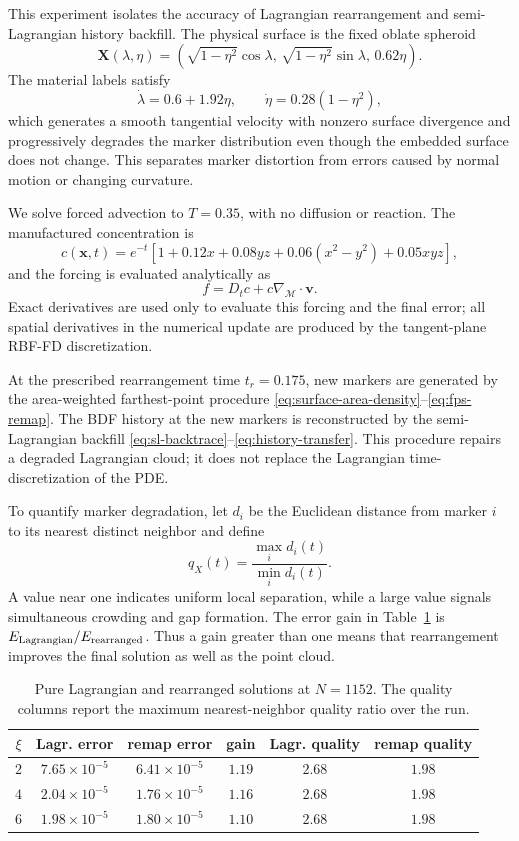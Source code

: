 \documentclass[a4paper,fleqn]{cas-sc}
\begin{document}
This experiment isolates the accuracy of Lagrangian rearrangement and
semi-Lagrangian history backfill.  The physical surface is the fixed oblate
spheroid
\[
  \bm X(\lambda,\eta)
  =
  \left(
    \sqrt{1-\eta^2}\cos\lambda,\,
    \sqrt{1-\eta^2}\sin\lambda,\,
    0.62\eta
  \right).
\]
The material labels satisfy
\[
  \dot\lambda=0.6+1.92\eta,
  \qquad
  \dot\eta=0.28(1-\eta^2),
\]
which generates a smooth tangential velocity with nonzero surface divergence
and progressively degrades the marker distribution even though the embedded
surface does not change.  This separates marker distortion from errors caused
by normal motion or changing curvature.

We solve forced advection to \(T=0.35\), with no diffusion or reaction.  The
manufactured concentration is
\[
  c(\bm x,t)
  =
  e^{-t}
  \left[
    1+0.12x+0.08yz+0.06(x^2-y^2)+0.05xyz
  \right],
\]
and the forcing is evaluated analytically as
\[
  f=D_t c+c\nabla_{\mathcal M}\!\cdot\bm v.
\]
Exact derivatives are used only to evaluate this forcing and the final error;
all spatial derivatives in the numerical update are produced by the
tangent-plane RBF-FD discretization.

At the prescribed rearrangement time \(t_r=0.175\), new markers are generated
by the area-weighted
farthest-point procedure
\eqref{eq:surface-area-density}--\eqref{eq:fps-remap}.  The BDF history at the
new markers is reconstructed by the semi-Lagrangian backfill
\eqref{eq:sl-backtrace}--\eqref{eq:history-transfer}.  This procedure repairs
a degraded Lagrangian cloud; it does not replace the Lagrangian
time-discretization of the PDE.

To quantify marker degradation, let \(d_i\) be the Euclidean distance from
marker \(i\) to its nearest distinct neighbor and define
\[
  q_X(t)=\frac{\max_i d_i(t)}{\min_i d_i(t)}.
\]
A value near one indicates uniform local separation, while a large value
signals simultaneous crowding and gap formation.  The error gain in
Table~\ref{tab:spheroid-adaptive-remap} is
\(E_{\rm Lagrangian}/E_{\rm rearranged}\).  Thus a gain greater than one means
that rearrangement improves the final solution as well as the point cloud.

\begin{table}[!htbp]
\centering
\caption{Pure Lagrangian and rearranged solutions at \(N=1152\).  The quality
columns report the maximum nearest-neighbor quality ratio over the run.}
\scriptsize
\setlength{\tabcolsep}{3pt}
\label{tab:spheroid-adaptive-remap}
\begin{tabular}{c c c c c c}
\toprule
\(\xi\) & Lagr. error & remap error & gain &
Lagr. quality & remap quality \\
\midrule
\(2\) & \(7.65{\times}10^{-5}\) & \(6.41{\times}10^{-5}\) & \(1.19\) & \(2.68\) & \(1.98\) \\
\(4\) & \(2.04{\times}10^{-5}\) & \(1.76{\times}10^{-5}\) & \(1.16\) & \(2.68\) & \(1.98\) \\
\(6\) & \(1.98{\times}10^{-5}\) & \(1.80{\times}10^{-5}\) & \(1.10\) & \(2.68\) & \(1.98\) \\
\bottomrule
\end{tabular}
\end{table}
\end{document}
